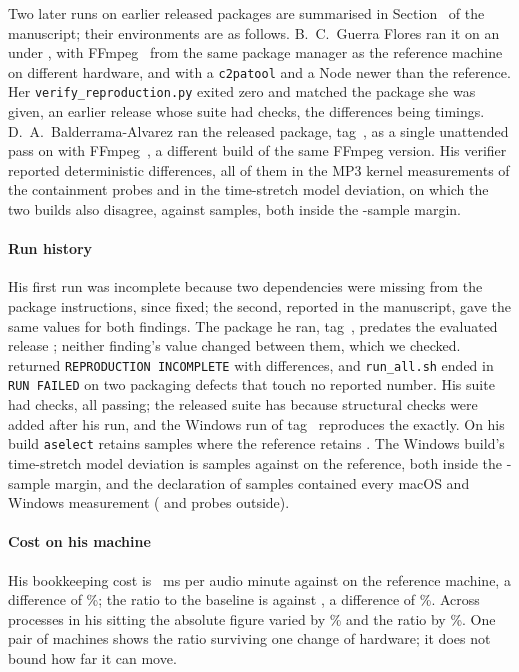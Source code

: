 \documentclass[11pt]{article}
\begin{document}
Two later runs on earlier released packages are summarised in Section~\SecIndependent{} of the
manuscript; their environments are as follows. B.~C.~Guerra Flores ran it on
an \XBMacCpu{} under \XBMacOs{}, with FFmpeg~\XBMacFfmpeg{} from the same
package manager as the reference machine on different hardware, and with a
\texttt{c2patool} and a Node newer than the reference. Her
\texttt{verify\_reproduction.py} exited zero and \XBMacVerdict{} matched the
package she was given, an earlier release whose suite had \XBMacChecks{}
checks, the \XBMacEnvDiffs{} differences being timings.
D.~A.~Balderrama-Alvarez ran the released package, tag~\XBWinTag{}, as a
single unattended pass on \XBWinOs{} with FFmpeg~\XBWinFfmpeg{}, a different
build of the same FFmpeg version. His verifier reported \XBWinDetDiffs{}
deterministic differences, all of them in the MP3 kernel measurements of
the containment probes and in the time-stretch model deviation, on which the two builds
also disagree, \XBRefStretchDev{} against \XBWinStretchDev{} samples, both
inside the \XBStretchGuard{}-sample margin.

\paragraph{Run history} His first run was incomplete because two dependencies
were missing from the package instructions, since fixed; the second, reported in
the manuscript, gave the same values for both findings. The package he ran,
tag~\IRtag{}, predates the evaluated release \Rtag{}; neither finding's value
changed between them, which we checked. 
returned \texttt{REPRODUCTION INCOMPLETE} with \IRdet{} differences, and
\texttt{run\_all.sh} ended in \texttt{RUN FAILED} on two packaging defects that
touch no reported number. His suite had \IRachecks{} checks, all passing; the
released suite has \Achecks{} because structural checks were added after his
run, and the Windows run of tag~\XBWinTag{} reproduces the \XBWinChecks{} exactly.
On his build \texttt{aselect} retains \IRsilLen{} samples where the reference
retains \IRsilLenRef{}. The Windows build's time-stretch model deviation is
\XBWinStretchDev{} samples against \XBRefStretchDev{} on the reference, both inside
the \XBStretchGuard{}-sample margin, and the declaration of \IRmpDeclared{}
samples contained every macOS and Windows measurement (\XBMacOutside{} and
\XBWinOutside{} probes outside).

\paragraph{Cost on his machine} His bookkeeping cost is \IRabs{}~ms per audio
minute against \IRabsRef{} on the reference machine, a difference of
\IRabsGap{}\%; the ratio to the baseline is \IRratio{} against \IRratioRef{}, a
difference of \IRratioGap{}\%. Across \MstabRepeats{} processes in his sitting the
absolute figure varied by \IRabsCv{}\% and the ratio by \IRratioCv{}\%. One pair of
machines shows the ratio surviving one change of hardware; it does not bound how
far it can move.
\end{document}
